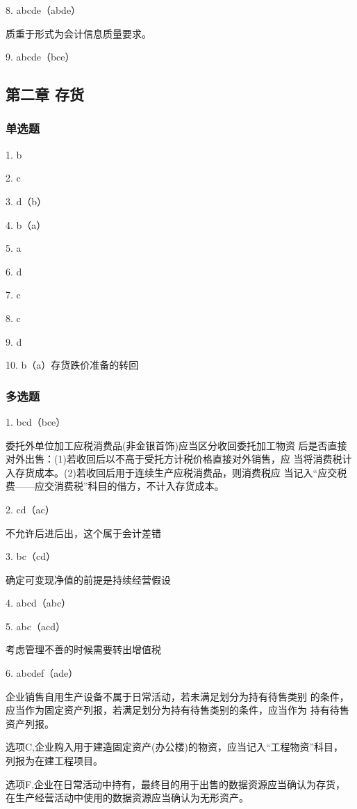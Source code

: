 \documentclass[UTF8,12pt]{ctexart}
\numberwithin{equation}{section} %
\numberwithin{figure}{section}
\numberwithin{table}{section}
\begin{document}
	8. abcde（abde）
	
	质重于形式为会计信息质量要求。
	
	9. abcde（bce）
	
	\subsection{第二章 存货}
	\subsubsection{单选题}
	1. b
	
	2. c
	
	3. d（b）
	
	4. b（a）
	
	5. a
	
	6. d
	
	7. c
	
	8. c
	
	9. d
	
	10. b（a）存货跌价准备的转回
	
	\subsubsection{多选题}
	1. bcd（bce）
	
	委托外单位加工应税消费品(非金银首饰)应当区分收回委托加工物资
	后是否直接对外出售：(1)若收回后以不高于受托方计税价格直接对外销售，应
	当将消费税计入存货成本。(2)若收回后用于连续生产应税消费品，则消费税应
	当记入“应交税费——应交消费税”科目的借方，不计入存货成本。
	
	2. cd（ac）
	
	不允许后进后出，这个属于会计差错
	
	3. bc（cd）
	
	确定可变现净值的前提是持续经营假设
	
	4. abcd（abc）
	
	5. abc（acd）
	
	考虑管理不善的时候需要转出增值税
	
	6. abcdef（ade）
	
	企业销售自用生产设备不属于日常活动，若未满足划分为持有待售类别
	的条件，应当作为固定资产列报，若满足划分为持有待售类别的条件，应当作为
	持有待售资产列报。
	
	选项C,企业购入用于建造固定资产(办公楼)的物资，应当记入“工程物资”科目，
	列报为在建工程项目。
	
	选项F,企业在日常活动中持有，最终目的用于出售的数据资源应当确认为存货，
	在生产经营活动中使用的数据资源应当确认为无形资产。
	
\end{document}
